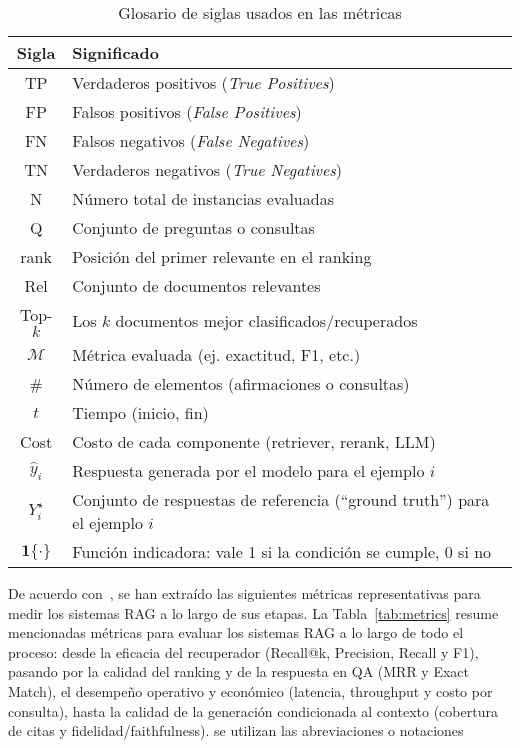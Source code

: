 \begin{table}[H]
    \centering
    \begin{tabularx}{\textwidth}{S M}
        \toprule
        \textbf{Sigla} & \textbf{Significado} \\
        \midrule
        TP & Verdaderos positivos (\textit{True Positives}) \\
        FP & Falsos positivos (\textit{False Positives}) \\
        FN & Falsos negativos (\textit{False Negatives}) \\
        TN & Verdaderos negativos (\textit{True Negatives}) \\
        N & Número total de instancias evaluadas \\
        Q & Conjunto de preguntas o consultas \\
        rank & Posición del primer relevante en el ranking \\
        Rel & Conjunto de documentos relevantes \\
        Top-$k$ & Los $k$ documentos mejor clasificados/recuperados \\
        $\displaystyle \mathcal{M}$ & Métrica evaluada (ej. exactitud, F1, etc.) \\
        \# & Número de elementos (afirmaciones o consultas) \\
        $t$ & Tiempo (inicio, fin) \\
        Cost & Costo de cada componente (retriever, rerank, LLM) \\
        $\displaystyle \hat{y}_i$ & Respuesta generada por el modelo para el ejemplo $i$ \\
        $\displaystyle Y_i^{\star}$ & Conjunto de respuestas de referencia (“ground truth”) para el ejemplo $i$ \\
        $\displaystyle \mathbf{1}\{\cdot\}$ & Función indicadora: vale 1 si la condición se cumple, 0 si no \\
        \bottomrule
    \end{tabularx}
    \caption{Glosario de siglas usados en las métricas}
    \label{tab:glosariometricas}
\end{table}

De acuerdo con~\textcite{knollmeyer2024benchmarking,hambarde2023ir,han2024rag,minaee2021}, se han extraído
las siguientes métricas representativas para medir los sistemas RAG a lo largo de sus etapas.
La Tabla~\ref{tab:metrics} resume mencionadas métricas para evaluar los sistemas RAG a lo largo de todo el proceso: desde la
eficacia del recuperador (Recall@k, Precision, Recall y F1), pasando por la calidad del ranking y de la respuesta en QA
(MRR y Exact Match), el desempeño operativo y económico (latencia, throughput y costo por consulta), hasta la calidad de
la generación condicionada al contexto (cobertura de citas y fidelidad/faithfulness).
se utilizan las abreviaciones o notaciones

